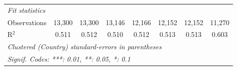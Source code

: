 \begin{tabular}{lccccccc}
   \midrule \emph{Fit statistics}\\
   Observations                                                    & 13,300         & 13,300         & 13,146        & 12,166        & 12,152        & 12,152        & 11,270\\  
   R$^2$                                                           & 0.511          & 0.512          & 0.510         & 0.512         & 0.513         & 0.513         & 0.603\\  
   \midrule
   \multicolumn{8}{l}{\emph{Clustered (Country) standard-errors in parentheses}}\\
   \multicolumn{8}{l}{\emph{Signif. Codes: ***: 0.01, **: 0.05, *: 0.1}}\\
\end{tabular}
\par\endgroup


